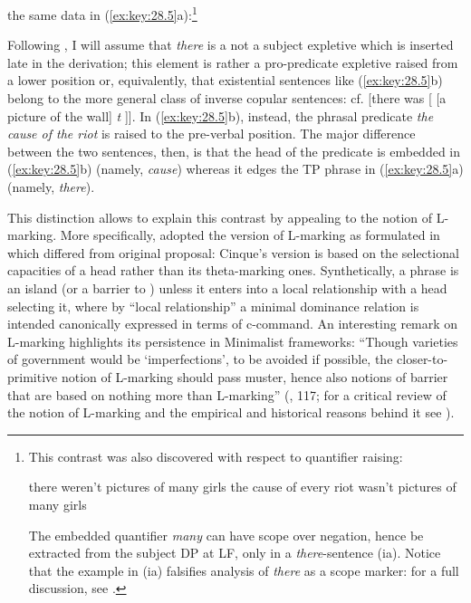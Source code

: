 \documentclass[output=paper]{langsci/langscibook}
\begin{document}
    the same data in (\ref{ex:key:28.5}a):\footnote{This contrast was also
        discovered with respect to quantifier raising:

\begin{exe}
    \begin{xlist}
    \ex there weren't pictures of many girls
	\ex the cause of every riot wasn't pictures of many girls
    \end{xlist}
\end{exe}

The embedded quantifier \emph{many} can have scope over negation, hence be
extracted from the subject DP at \gls{LF}, only in a \emph{there}-sentence (ia).
Notice that the example in (ia) falsifies  analysis of
\emph{there} as a scope marker: for a full discussion, see \citet[Ch.\
2]{Moro1997}.}

\ea%
    \label{ex:key:28.5}
	\z
\z

Following \textcite{Moro1988,Moro1997}, I will assume that \emph{there} is a
not a subject expletive which is inserted late in the derivation; this element
is rather a pro-predicate expletive raised from a lower position or,
equivalently, that existential sentences like (\ref{ex:key:28.5}b) belong to the
more general class of inverse copular\is{copulas} sentences: cf. [there was [ [a picture of
the wall] \emph{t} ]]. In (\ref{ex:key:28.5}b), instead, the phrasal predicate
\emph{the cause of the riot} is raised to the pre-verbal position. The major
difference between the two sentences, then, is that the head of the predicate
is embedded in (\ref{ex:key:28.5}b) (namely, \emph{cause}) whereas it edges the TP
phrase in (\ref{ex:key:28.5}a) (namely, \emph{there}).

This distinction allows to explain this contrast by appealing to the notion of
L-marking. More specifically, \citet{Moro1997} adopted the version of L-marking
as formulated in \citet{Cinque1990} which differed from \citegen{Chomsky1986}
original proposal: Cinque's version is based on the selectional capacities of a
head rather than its theta-marking ones. Synthetically, a phrase is an
island\is{islands}
(or a barrier to ) unless it enters into a local relationship with a
head selecting it, where by “local relationship” a minimal dominance relation
is intended canonically expressed in terms of c-command. An interesting remark
on L-marking highlights its persistence in Minimalist frameworks: “Though
varieties of government would be `imperfections', to be avoided if possible,
the closer-to-primitive notion of L-marking should pass muster, hence also
notions of barrier that are based on nothing more than L-marking”
(\citealt{Chomsky2000}, 117; for a critical review of the notion of L-marking
and the empirical and historical reasons behind it see \citealt{Roberts1988}).\largerpage[2]
\end{document}
